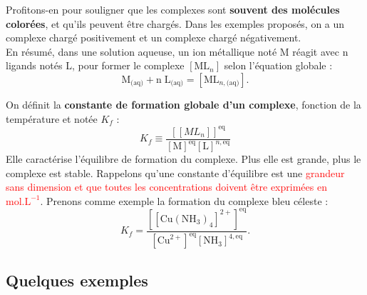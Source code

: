 \documentclass[11pt,a4paper]{report}
\begin{document}
Profitons-en pour souligner que les complexes sont \textbf{souvent des molécules colorées}, et qu'ils peuvent être chargés. Dans les exemples proposés, on a un complexe chargé positivement et un complexe chargé négativement.\\

En résumé, dans une solution aqueuse, un ion métallique noté M réagit avec n ligands notés L, pour former le complexe $[\text{ML}_n]$ selon l'équation globale :
\begin{equation}
	\boxed{\text{M}_\text{(aq)} + \text{n}\;\text{L}_\text{(aq)} = [\text{ML}_{n,\text{(aq)}}]}.
\end{equation}

On définit la \textbf{constante de formation globale d'un complexe}, fonction de la température et notée $K_f$ :
\begin{equation}
	K_f \equiv \frac{[[ML_n]]^\text{eq}}{[\text{M}]^\text{eq}[\text{L}]^{n,\text{eq}}}
\end{equation}
Elle caractérise l'équilibre de formation du complexe. Plus elle est grande, plus le complexe est stable. Rappelons qu'une constante d'équilibre est une \textcolor{red}{grandeur sans dimension et que toutes les concentrations doivent être exprimées en $\text{mol}.\text{L}^{-1}$}. Prenons comme exemple la formation du complexe bleu céleste :
\begin{equation}
	K_f = \frac{[[\text{Cu}{(\text{NH}_3)}_4]^{2+}]^\text{eq}}
	{[\text{Cu}^{2+}]^\text{eq}[\text{NH}_3]^{4,\text{eq}}}.
\end{equation}

\newpage
\subsection{Quelques exemples}
\end{document}
